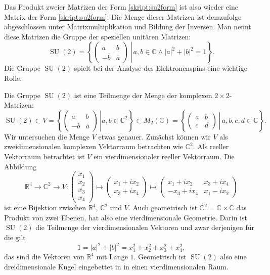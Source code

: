 Das Produkt zweier Matrizen der Form \eqref{skript:su2form} ist also wieder eine
Matrix der Form \eqref{skript:su2form}.
Die Menge dieser Matrizen ist demzufolge abgeschlossen unter
Matrixmultiplikation und Bildung der Inversen.
Man nennt diese Matrizen die Gruppe der speziellen unitären Matrizen:
\[
\operatorname{SU}(2)=\left\{
\left.
\begin{pmatrix}
a&b\\-\bar b&\bar a
\end{pmatrix}
\,
\right|
\,
a,b\in\mathbb C\wedge
|a|^2+|b|^2=1
\right\}.
\]
Die Gruppe $\operatorname{SU}(2)$ spielt bei der Analyse des Elektronenspins
eine wichtige Rolle.

Die Gruppe $\operatorname{SU}(2)$ ist eine Teilmenge der Menge der komplexen
$2\times 2$-Matrizen:
\[
\operatorname{SU}(2)
\subset
V=
\left\{
\left.
\begin{pmatrix}a&b\\-\bar b&\bar a\end{pmatrix}\,
\right|
a,b\in\mathbb C^2
\right\}
\subset
M_2(\mathbb C)
=\left\{
\left.
\begin{pmatrix}
a&b\\c&d
\end{pmatrix}
\,
\right|
\, a,b,c,d\in\mathbb C
\right\}.
\]
Wir untersuchen die Menge $V$ etwas genauer.
Zunächst können wir $V$ als zweidimensionalen komplexen Vektorraum
betrachten wie $\mathbb C^2$.
Als reeller Vektorraum betrachtet ist $V$ ein vierdimensionaler
reeller Vektorraum. Die Abbildung
\[
\mathbb R^4\to\mathbb C^2\to V
:
\begin{pmatrix}x_1\\x_2\\x_3\\x_4\end{pmatrix}\mapsto
\begin{pmatrix}x_1+ix_2\\x_3+ix_4\end{pmatrix}\mapsto
\begin{pmatrix} x_1+ix_2 & x_3+ix_4 \\
               -x_3+ix_4 & x_1-ix_2 \end{pmatrix}
\]
ist eine Bijektion zwischen $\mathbb R^4$, $\mathbb C^2$ und $V$.
Auch geometrisch ist $\mathbb C^2=\mathbb C\times \mathbb C$ das Produkt
von zwei Ebenen, hat also eine vierdimensionale Geometrie.
Darin ist $\operatorname{SU}(2)$ die Teilmenge der vierdimensionalen Vektoren
und zwar derjenigen für die gilt
\[
1
=
|a|^2+|b|^2
= 
x_1^2 + x_2^2 + x_3^2 + x_4^2,
\]
das sind die Vektoren von $\mathbb R^4$ mit Länge $1$.
Geometrisch ist $\operatorname{SU}(2)$ also eine dreidimensionale Kugel
eingebettet in in einen vierdimensionalen Raum.

